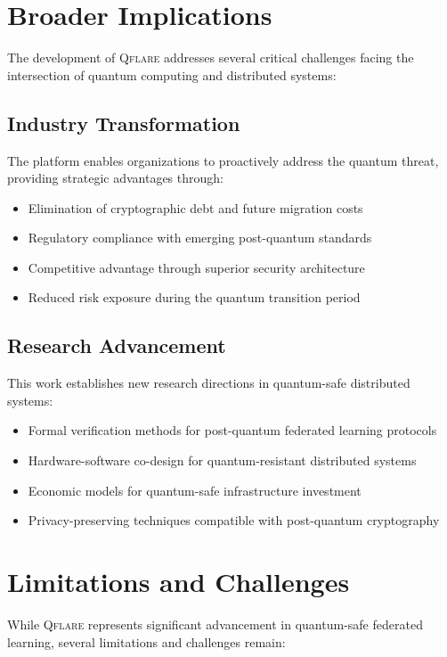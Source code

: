 \documentclass[12pt,a4paper,twoside]{book}
\newcommand{\qflare}{\textsc{Qflare}}
\begin{document}
\section{Broader Implications}
\label{sec:broader-implications}

The development of \qflare{} addresses several critical challenges facing the intersection of quantum computing and distributed systems:

\subsection{Industry Transformation}

The platform enables organizations to proactively address the quantum threat, providing strategic advantages through:
\begin{itemize}
\item Elimination of cryptographic debt and future migration costs
\item Regulatory compliance with emerging post-quantum standards
\item Competitive advantage through superior security architecture
\item Reduced risk exposure during the quantum transition period
\end{itemize}

\subsection{Research Advancement}

This work establishes new research directions in quantum-safe distributed systems:
\begin{itemize}
\item Formal verification methods for post-quantum federated learning protocols
\item Hardware-software co-design for quantum-resistant distributed systems
\item Economic models for quantum-safe infrastructure investment
\item Privacy-preserving techniques compatible with post-quantum cryptography
\end{itemize}

\section{Limitations and Challenges}
\label{sec:limitations}

While \qflare{} represents significant advancement in quantum-safe federated learning, several limitations and challenges remain:
\end{document}
